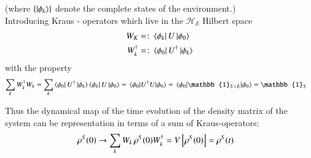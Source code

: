 (where $\lbrace\ket{\phi_{k}}\rbrace$ denote the complete states of the environment.)\\ 
Introducing  Kraus - operators which live in the $\mathcal{H_{S}}$ Hilbert space
\begin{align}\label{aft33:55}
W_{K}&=\colon\bra{\phi_{k}}U\ket{\phi_{0}}\\
{W}_{k}^{ \dagger} &=\colon \bra{\phi_{0}}U^{\dagger}\ket{\phi_{k}}
\end{align}
with the property
\begin{align}\label{aft33:56}
\sum_{k}{ W }_{ k }^{ \dagger}{ W }_{ k } &=\sum_{k}\bra{\phi_{0}}U^{\dagger}\ket{\phi_{k}}\bra{\phi_{k}}U\ket{\phi_{0}}=\expval{U^{\dagger}U}{{\phi_{0}}}=\expval{\mathbb{1}_{S+E}}{{\phi_{0}}}={\mathbb{1}_{S}}
\end{align}

Thus the dynamical map of the time evolution of the density matrix of the system can be representation in terms of a sum of Kraus-operators:
\begin{align}
\rho^{S}(0) &\rightarrow\sum_{k}W_{k}\thinspace\rho^{S}(0)W_{k}^{\dagger}= V\left[\rho^{S}(0)\right]=\rho^{S}(t)
\end{align}

